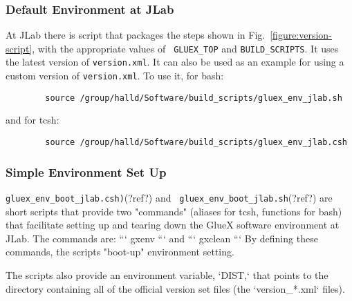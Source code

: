 \documentclass[12pt]{article}
\begin{document}
\subsubsection{Default Environment at JLab}

At JLab there is script that packages the steps shown in
Fig.~\ref{figure:version-script}, with the appropriate values of {\tt
  GLUEX\_TOP} and {\tt BUILD\_SCRIPTS}. It uses the latest version of
{\tt version.xml}. It can also be used as an example for using a
custom version of {\tt version.xml}. To use it, for bash:
\begin{verbatim}
        source /group/halld/Software/build_scripts/gluex_env_jlab.sh
\end{verbatim}
and for tcsh:
\begin{verbatim}
        source /group/halld/Software/build_scripts/gluex_env_jlab.csh
\end{verbatim}

\subsubsection{Simple Environment Set Up}

{\tt gluex\_env\_boot\_jlab.csh)}(?ref?) and {\tt
  gluex\_env\_boot\_jlab.sh}(?ref?) are short scripts that provide two
"commands" (aliases for tcsh, functions for bash) that facilitate
setting up and tearing down the GlueX software environment at
JLab. The commands are: ``` gxenv ``` and ``` gxclean ``` By defining
these commands, the scripts "boot-up" environment setting.

The scripts also provide an environment variable, `DIST,` that points
to the directory containing all of the official version set files (the
`version\_*.xml` files).
\end{document}

